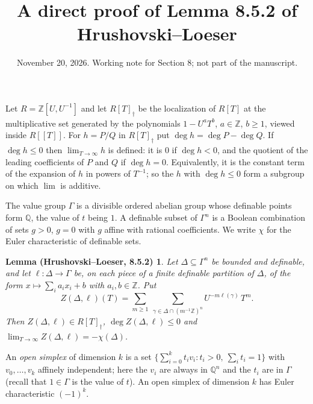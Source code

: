 \documentclass[12pt]{amsart}
\newtheorem*{lemA}{Lemma (Hrushovski--Loeser, 8.5.2)}
\theoremstyle{remark}
\newcommand{\Z}{\mathbb Z}
\newcommand{\Q}{\mathbb Q}
\begin{document}
\title{A direct proof of Lemma 8.5.2 of Hrushovski--Loeser}
\date{November 20, 2026. Working note for Section 8; not part of the manuscript.}
\maketitle

Let $R = \Z[U, U^{-1}]$ and let $R[T]_\dag$ be the localization of $R[T]$ at the multiplicative set generated by the polynomials $1 - U^a T^b$, $a \in \Z$, $b \geq 1$, viewed inside $R[[T]]$. For $h = P/Q$ in $R[T]_\dag$ put $\deg h = \deg P - \deg Q$. If $\deg h \leq 0$ then $\lim_{T \to \infty} h$ is defined: it is $0$ if $\deg h < 0$, and the quotient of the leading coefficients of $P$ and $Q$ if $\deg h = 0$. Equivalently, it is the constant term of the expansion of $h$ in powers of $T^{-1}$; so the $h$ with $\deg h \leq 0$ form a subgroup on which $\lim$ is additive.

The value group $\Gamma$ is a divisible ordered abelian group whose definable points form $\Q$, the value of $t$ being $1$. A definable subset of $\Gamma^n$ is a Boolean combination of sets $g > 0$, $g = 0$ with $g$ affine with rational coefficients. We write $\chi$ for the Euler characteristic of definable sets.

\begin{lemA}
Let $\Delta \subseteq \Gamma^n$ be bounded and definable, and let $\ell : \Delta \to \Gamma$ be, on each piece of a finite definable partition of $\Delta$, of the form $x \mapsto \sum_i a_i x_i + b$ with $a_i, b \in \Z$. Put
\[
Z(\Delta, \ell)(T) = \sum_{m \geq 1} \ \sum_{\gamma \in \Delta \cap (m^{-1}\Z)^n} U^{-m \ell(\gamma)}\, T^m .
\]
Then $Z(\Delta, \ell) \in R[T]_\dag$, $\deg Z(\Delta,\ell) \leq 0$ and $\lim_{T \to \infty} Z(\Delta, \ell) = - \chi(\Delta)$.
\end{lemA}

An \emph{open simplex} of dimension $k$ is a set $\{\sum_{i=0}^k t_i v_i : t_i > 0, \ \sum_i t_i = 1\}$ with $v_0, \ldots, v_k$ affinely independent; here the $v_i$ are always in $\Q^n$ and the $t_i$ are in $\Gamma$ (recall that $1 \in \Gamma$ is the value of $t$). An open simplex of dimension $k$ has Euler characteristic $(-1)^k$.
\end{document}
